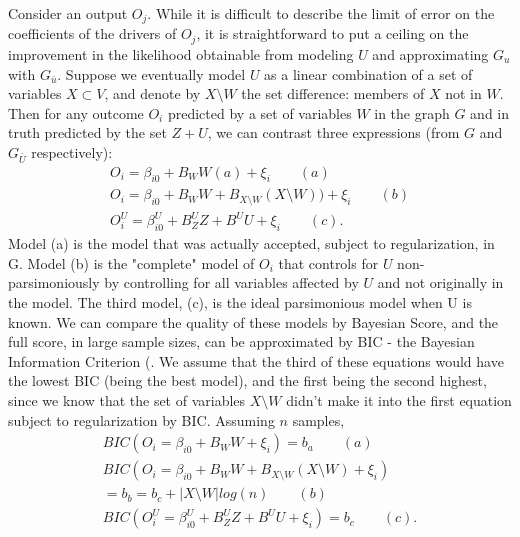 \documentclass{article}
\begin{document}
Consider an output $O_j$.  While it is difficult to describe the limit of error on the coefficients of the drivers of $O_j$, it is straightforward to put a ceiling on the improvement in the likelihood obtainable from modeling $U$ and approximating $G_u$ with $G_{\bar{u}}$.  Suppose we eventually model $U$ as a linear combination of a set of variables $X \subset V$, and denote by $X \setminus W$ the set difference: members of $X$ not in $W$.  Then for any outcome $O_i$ predicted by a set of variables $W$ in the graph $G$ and in truth predicted by the set $Z + U$, we can contrast three expressions (from $G$ and $G_{\bar{U}}$ respectively):
\begin{equation}
\begin{split}
O_i = \beta_{i0} + B_W W (a) + \xi_i \qquad (a)\\
O_i = \beta_{i0} + B_W W + B_{X \setminus W} (X \setminus W)) + \xi_i \qquad (b)\\
O_i^U = \beta_{i0}^U + B_Z^U Z + B^U U + \xi_i \qquad (c).
\end{split}
\end{equation}
Model (a) is the model that was actually accepted, subject to regularization, in G.  Model (b) is the "complete" model of $O_i$ that controls for $U$ non-parsimoniously by controlling for all variables affected by $U$ and not originally in the model.  The third model, (c), is the ideal parsimonious model when U is known.  We can compare the quality of these models by Bayesian Score, and the full score, in large sample sizes, can be approximated by BIC - the Bayesian Information Criterion (\cite{koller_probabilistic_2009}.  We assume that the third of these equations would have the lowest BIC (being the best model), and the first being the second highest, since we know that the set of variables $X \setminus W$ didn't make it into the first equation subject to regularization by BIC.  Assuming $n$ samples,
\begin{equation}
\begin{split}
BIC(O_i = \beta_{i0} + B_W W + \xi_i) = b_a \qquad (a)\\
BIC(O_i = \beta_{i0} + B_W W + B_{X \setminus W} (X \setminus W) + \xi_i) \\= b_b = b_c + |X \setminus W| log(n) \qquad (b)\\
BIC(O_i^U = \beta_{i0}^U + B_Z^U Z + B^U U + \xi_i) = b_c \qquad (c).
\end{split}
\label{eq:ceilingTheoremPrep}
\end{equation}
\end{document}
